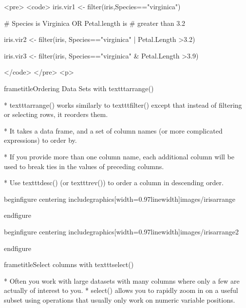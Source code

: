 		<pre>
			<code>
			iris.vir1 <- filter(iris,Species=="virginica")
			
			# Species is Virginica OR Petal.length is 
			# greater than 3.2
			
			iris.vir2 <- filter(iris,
			Species=="virginica" | Petal.Length >3.2)
			
			iris.vir3 <- filter(iris,
			Species=="virginica" & Petal.Length >3.9)
			
			</code>
		</pre>
<p>
	
	
		frametitle{Ordering Data Sets with texttt{arrange()}}
		
			         * texttt{arrange()} works similarly to texttt{filter()} except that instead of filtering or selecting rows, it reorders them. 
			
			         * It takes a data frame, and a set of column names (or more complicated expressions) to order by.
			
			         * If you provide more than one column name, each additional column will be used to break ties in the values of preceding columns.
			
			         * Use texttt{desc()} (or texttt{rev()}) to order a column in descending order.
			
		
	
	
		begin{figure}
			centering
			includegraphics[width=0.97linewidth]{images/irisarrange}
			
		end{figure}
		
	
	
	
	
		begin{figure}
			centering
			includegraphics[width=0.97linewidth]{images/irisarrange2}
			
		end{figure}
		
	
	
	
	
		frametitle{Select columns with texttt{select()}}
		
			         * Often you work with large datasets with many columns where only a few are actually of interest to you. 
			         * select() allows you to rapidly zoom in on a useful subset using operations that usually only work on numeric variable positions.
		
